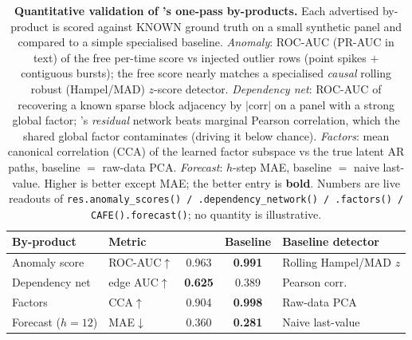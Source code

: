 \begin{table}[t]\centering\small
\setlength{\tabcolsep}{5pt}
\caption{\textbf{Quantitative validation of \cafe{}'s one-pass by-products.} Each advertised by-product is scored against KNOWN ground truth on a small synthetic panel and compared to a simple specialised baseline. \emph{Anomaly}: ROC-AUC (PR-AUC in text) of the free per-time score vs injected outlier rows (point spikes $+$ contiguous bursts); the free score nearly matches a specialised \emph{causal} rolling robust (Hampel/MAD) $z$-score detector. \emph{Dependency net}: ROC-AUC of recovering a known sparse block adjacency by $|\text{corr}|$ on a panel with a strong global factor; \cafe{}'s \emph{residual} network beats marginal Pearson correlation, which the shared global factor contaminates (driving it below chance). \emph{Factors}: mean canonical correlation (CCA) of the learned factor subspace vs the true latent AR paths, baseline $=$ raw-data PCA. \emph{Forecast}: $h$-step MAE, baseline $=$ naive last-value. Higher is better except MAE; the better entry is \textbf{bold}. Numbers are live readouts of \texttt{res.anomaly\_scores() / .dependency\_network() / .factors() / CAFE().forecast()}; no quantity is illustrative.}
\label{tab:byproduct}
\begin{tabular}{@{}llcc l@{}}
\toprule
By-product & Metric & \cafe{} & Baseline & Baseline detector \\
\midrule
Anomaly score & ROC-AUC$\uparrow$ & 0.963 & \textbf{0.991} & Rolling Hampel/MAD $z$ \\
Dependency net & edge AUC$\uparrow$ & \textbf{0.625} & 0.389 & Pearson corr.\ \\
Factors & CCA$\uparrow$ & 0.904 & \textbf{0.998} & Raw-data PCA \\
Forecast ($h{=}12$) & MAE$\downarrow$ & 0.360 & \textbf{0.281} & Naive last-value \\
\bottomrule
\end{tabular}
\end{table}
